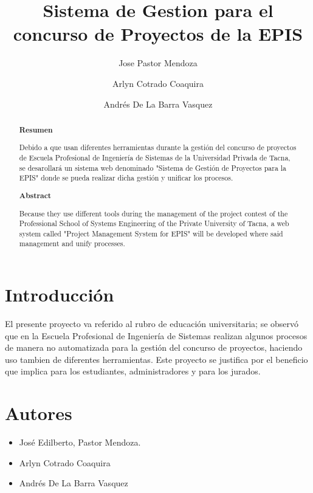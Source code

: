 \documentclass[%
 reprint,
 amsmath,amssymb,
 aps,
]{revtex4-1}
\begin{document}
\title{Sistema de Gestion para el concurso de Proyectos de la EPIS}
\author{Jose Pastor Mendoza}
\author{Arlyn Cotrado Coaquira}
\author{Andrés De La Barra Vasquez}
%

\begin{abstract}
\begin{center}
\textbf{Resumen}
\end{center}
Debido a que usan diferentes herramientas durante la gestión del concurso de proyectos de Escuela Profesional de Ingeniería de Sistemas de la Universidad Privada de Tacna, se desarollará un sistema web denominado "Sistema de Gestión de Proyectos para la EPIS" donde se pueda realizar dicha gestión y unificar los procesos.


\begin{center}
\textbf{Abstract}
\end{center}
Because they use different tools during the management of the project contest of the Professional School of Systems Engineering of the Private University of Tacna, a web system called "Project Management System for EPIS" will be developed where said management and unify processes.

\end{abstract}



\maketitle


\section {Introducción}

El presente proyecto va referido al rubro de educación universitaria; se observó que en la Escuela Profesional de Ingeniería de Sistemas realizan algunos procesos de manera no automatizada para la gestión del concurso de proyectos, haciendo uso tambien de diferentes herramientas.
Este proyecto se justifica por el beneficio que implica para los estudiantes, administradores y para los jurados.

\section{Autores}
\begin{itemize}
\item José Edilberto, Pastor Mendoza.
\item Arlyn Cotrado Coaquira
\item Andrés De La Barra Vasquez
\end{itemize}
\end{document}
